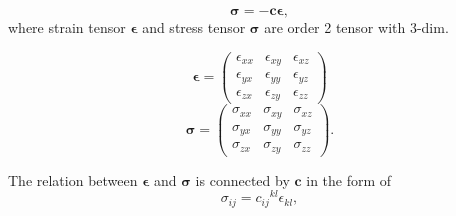 \documentclass[12pt]{extarticle}
\numberwithin{equation}{section}
\numberwithin{figure}{section}
\numberwithin{table}{section}
\newcommand{\<}{\langle}
\renewcommand{\>}{\rangle}
\theoremstyle{definition}
\begin{document}
\begin{itemize}
{\begin{itemize}
\begin{equation}
                                \boldsymbol{\sigma} = - \boldsymbol{c} \boldsymbol{\epsilon},
                                \label{Hooke's law in tensor form}
                            \end{equation}
                            where strain tensor $\boldsymbol{\epsilon}$ and stress tensor $\boldsymbol{\sigma}$ are order 2 tensor with 3-dim.
                                \begin{multicols}{2}
                                \setlength{\columnseprule}{0pt}
                                \noindent
                                    \begin{equation}
                                        \boldsymbol{\epsilon} = 
                                            \begin{pmatrix}
                                                \epsilon_{xx} & \epsilon_{xy} & \epsilon_{xz}\\
                                                \epsilon_{yx} & \epsilon_{yy} & \epsilon_{yz}\\
                                                \epsilon_{zx} & \epsilon_{zy} & \epsilon_{zz}
                                            \end{pmatrix}
                                    \end{equation}
                                    \begin{equation}
                                        \boldsymbol{\sigma} = 
                                            \begin{pmatrix}
                                                \sigma_{xx} & \sigma_{xy} & \sigma_{xz}\\
                                                \sigma_{yx} & \sigma_{yy} & \sigma_{yz}\\
                                                \sigma_{zx} & \sigma_{zy} & \sigma_{zz}
                                            \end{pmatrix}.
                                    \end{equation}
                                \end{multicols}
                            The relation between $\boldsymbol{\epsilon}$ and $\boldsymbol{\sigma}$ is connected by $\boldsymbol{c}$ in the form of
                                \begin{equation}
                                    \sigma_{ij} = {c_{ij}}^{kl}\epsilon_{kl},
                                \end{equation}

\end{itemize}}
\end{itemize}
\end{document}
